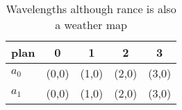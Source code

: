 \documentclass[a4paper]{article}
\begin{document}
\begin{table}
\begin{adjustbox}{width=0.8\columnwidth}
\begin{tabular}{|l|l|l|l|l|}
\hline
\textbf{plan} & \multicolumn{1}{c|}{\textbf{0}} & \multicolumn{1}{c|}{\textbf{1}} & \multicolumn{1}{c|}{\textbf{2}} & \multicolumn{1}{c|}{\textbf{3}} \\ \hline
\textbf{$a_0$}  & (0,0) & (1,0) & (2,0) & (3,0) \\ \hline
\textbf{$a_1$}  & (0,0) & (1,0) & (2,0) & (3,0) \\ \hline
\end{tabular}
\end{adjustbox}
\caption{Wavelengths although rance is also a weather map 
}
\end{table}
\end{document}
